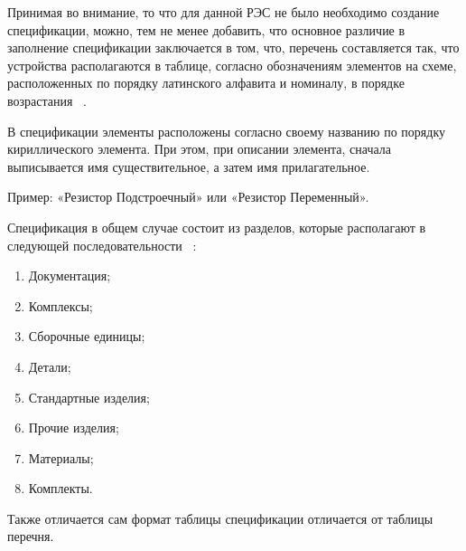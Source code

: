 Принимая во внимание,
то что для данной РЭС не было необходимо создание спецификации,
можно, тем не менее добавить,
что основное различие в заполнение спецификации заключается в том,
что, перечень составляется так, что устройства располагаются в таблице,
согласно обозначениям элементов на схеме, расположенных по порядку латинского алфавита и номиналу,
в порядке возрастания ~\cite{GOST-spec}.

В спецификации
элементы расположены согласно своему названию по порядку
кириллического элемента. При этом, при описании элемента,
сначала выписывается имя существительное, а затем имя прилагательное.

Пример: «Резистор Подстроечный» или «Резистор Переменный».

Спецификация в общем случае состоит из разделов,
которые располагают в следующей последовательности ~\cite{GOST-spec}:
\begin{enumerate}
\item Документация;
\item Комплексы;
\item Сборочные единицы;
\item Детали;
\item Стандартные изделия;
\item Прочие изделия;
\item Материалы;
\item Комплекты.
\end{enumerate}

Также отличается сам формат таблицы спецификации отличается от таблицы перечня.

\newpage

